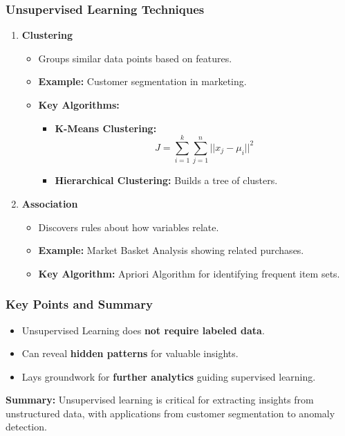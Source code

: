 \documentclass[aspectratio=169]{beamer}
\begin{document}
\begin{frame}[fragile]
    \frametitle{Unsupervised Learning Techniques}
    \begin{enumerate}
        \item \textbf{Clustering}
            \begin{itemize}
                \item Groups similar data points based on features.
                \item \textbf{Example:} Customer segmentation in marketing.
                \item \textbf{Key Algorithms:}
                    \begin{itemize}
                        \item \textbf{K-Means Clustering:} 
                        \begin{equation}
                        J = \sum_{i=1}^{k} \sum_{j=1}^{n} ||x_j - \mu_i||^2
                        \end{equation}
                        \item \textbf{Hierarchical Clustering:} Builds a tree of clusters.
                    \end{itemize}
            \end{itemize}
        \item \textbf{Association}
            \begin{itemize}
                \item Discovers rules about how variables relate.
                \item \textbf{Example:} Market Basket Analysis showing related purchases.
                \item \textbf{Key Algorithm:} Apriori Algorithm for identifying frequent item sets.
            \end{itemize}
    \end{enumerate}
\end{frame}

\begin{frame}[fragile]
    \frametitle{Key Points and Summary}
    \begin{itemize}
        \item Unsupervised Learning does \textbf{not require labeled data}.
        \item Can reveal \textbf{hidden patterns} for valuable insights.
        \item Lays groundwork for \textbf{further analytics} guiding supervised learning.
    \end{itemize}
    \par \textbf{Summary:} 
    Unsupervised learning is critical for extracting insights from unstructured data, with applications from customer segmentation to anomaly detection.
\end{frame}
\end{document}
